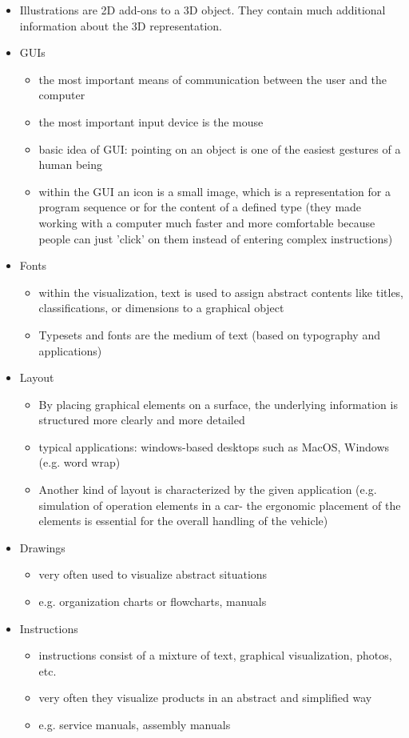 \documentclass[12pt]{article}
\begin{document}
\begin{itemize}
	\item Illustrations are 2D add-ons to a 3D object. They contain much additional information about the 3D representation.
	\item GUIs
		\begin{itemize}
			\item the most important means of communication between the user and the computer
			\item the most important input device is the mouse
			\item basic idea of GUI: pointing on an object is one of the easiest gestures of a human being
			\item within the GUI an icon is a small image, which is a representation for a program sequence or for the content of a defined type (they made working with a computer much faster and more comfortable because people can just 'click' on them instead of entering complex instructions)
		\end{itemize}
	\item Fonts
		\begin{itemize}
			\item within the visualization, text is used to assign abstract contents like titles, classifications, or dimensions to a graphical object
			\item Typesets and fonts are the medium of text (based on typography and applications)
		\end{itemize}
	\item Layout
		\begin{itemize}
			\item By placing graphical elements on a surface, the underlying information is structured more clearly and more detailed
			\item typical applications: windows-based desktops such as MacOS, Windows (e.g. word wrap)
			\item Another kind of layout is characterized by the given application (e.g. simulation of operation elements in a car- the ergonomic placement of the elements is essential for the overall handling of the vehicle)
		\end{itemize}
	\item Drawings
		\begin{itemize}
			\item very often used to visualize abstract situations
			\item e.g. organization charts or flowcharts, manuals
		\end{itemize}
	\item Instructions
		\begin{itemize}
			\item instructions consist of a mixture of text, graphical visualization, photos, etc.
			\item very often they visualize products in an abstract and simplified way
			\item e.g. service manuals, assembly manuals
		\end{itemize}
\end{itemize}
\end{document}
